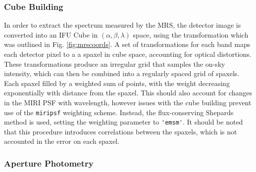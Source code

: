\subsubsection{Cube Building}
In order to extract the spectrum measured by the MRS, the detector image is converted into an IFU Cube in $(\alpha,\beta,\lambda)$ space, using the transformation which was outlined in Fig. \ref{fig:mrscoords}.
A set of transformations for each band maps each detector pixel to a a spaxel in cube space, accounting for  optical distortions. 
These transformations produce an irregular grid that samples the on-sky intensity, which can then be combined into a regularly spaced grid of spaxels.
Each spaxel filled by a weighted sum of points, with the weight decreasing exponentially with distance from the spaxel. 
This should also account for changes in the MIRI PSF with wavelength, however issues with the cube building prevent use of the \verb|miripsf| weighting scheme.
Instead, the flux-conserving Shepards method is used, setting the weighting parameter to \verb|'emsm'|.
It should be noted that this procedure introduces correlations between the spaxels, which is not accounted in the error on each spaxel.

\subsubsection{Aperture Photometry}

